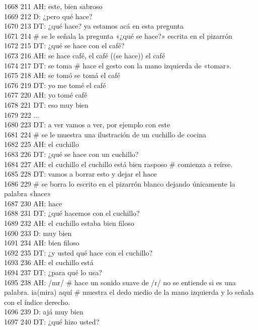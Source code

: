 1668 211 AH: este, bien sabroso\\
1669 212 D: ¿pero qué hace?\\
1670 213 DT: ¿qué hace? ya estamos acá en esta pregunta\\
1671 214 # se le señala la pregunta «¿qué se hace?» escrita en el pizarrón\\
1672 215 DT: ¿qué se hace con el café?\\
1673 216 AH: se hace café, el café ((se hace)) el café\\
1674 217 DT: se toma # hace el gesto con la mano izquierda de «tomar».\\
1675 218 AH: se tomó se tomá el café\\
1676 219 DT: yo me tomé el café\\
1677 220 AH: yo tomé café\\
1678 221 DT: eso muy bien\\
1679 222 ...\\
1680 223 DT: a ver vamos a ver, por ejemplo con este\\
1681 224 # se le muestra una ilustración de un cuchillo de cocina\\
1682 225 AH: el cuchillo\\
1683 226 DT: ¿qué se hace con un cuchillo?\\
1684 227 AH: el cuchillo el cuchillo está bien rasposo # comienza a reírse.\\
1685 228 DT: vamos a borrar esto y dejar el hace\\
1686 229 # se borra lo escrito en el pizarrón blanco dejando únicamente la palabra «hace»\\
1687 230 AH: hace\\
1688 231 DT: ¿qué hacemos con el cuchillo?\\
1689 232 AH: el cuchillo estaba bien filoso\\
1690 233 D: muy bien\\
1691 234 AH: bien filoso\\
1692 235 DT: ¿y usted qué hace con el cuchillo?\\
1693 236 AH: el cuchillo está\\
1694 237 DT: ¿para qué lo usa?\\
1695 238 AH: /mr/ # hace un sonido suave de /r/ no se entiende si es una palabra. ia(mira) aquí # muestra el dedo medio de la mano izquierda y lo señala con el índice derecho.\\
1696 239 D: ajá muy bien\\
1697 240 DT: ¿qué hizo usted?\\
